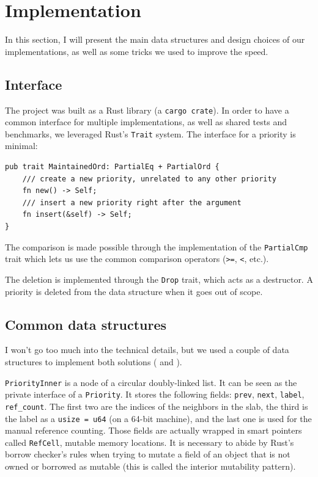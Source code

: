 \documentclass[12pt]{article}
\begin{document}
\newpage
\section{Implementation}

In this section, I will present the main data structures and design choices of our implementations, as well as some tricks we used to improve the speed.

\subsection{Interface}

The project was built as a Rust library (a \lstinline{cargo crate}). In order to have a common interface for multiple implementations, as well as shared tests and benchmarks, we leveraged Rust's \lstinline{Trait} system. The interface for a priority is minimal:

\begin{lstlisting}
pub trait MaintainedOrd: PartialEq + PartialOrd {
    /// create a new priority, unrelated to any other priority
    fn new() -> Self;
    /// insert a new priority right after the argument
    fn insert(&self) -> Self;
}
\end{lstlisting}

The comparison is made possible through the implementation of the \lstinline{PartialCmp} trait which lets us use the common comparison operators (\lstinline{>=}, \lstinline{<}, etc.).

The deletion is implemented through the \lstinline{Drop} trait, which acts as a destructor. A priority is deleted from the data structure when it goes out of scope.

\subsection{Common data structures}

I won't go too much into the technical details, but we used a couple of data structures to implement both solutions (\cite{10.5555/647912.740822} and \cite{10.1145/28395.28434}).

\lstinline{PriorityInner} is a node of a circular doubly-linked list.
It can be seen as the private interface of a \lstinline{Priority}.
It stores the following fields: \lstinline{prev}, \lstinline{next}, \lstinline{label}, \lstinline{ref_count}.
The first two are the indices of the neighbors in the slab, the third is the label as a \lstinline{usize = u64} (on a 64-bit machine), and the last one is used for the manual reference counting.
Those fields are actually wrapped in smart pointers called \lstinline{RefCell}, mutable memory locations.
It is necessary to abide by Rust's borrow checker's rules when trying to mutate a field of an object that is not owned or borrowed as mutable (this is called the interior mutability pattern).
\end{document}
